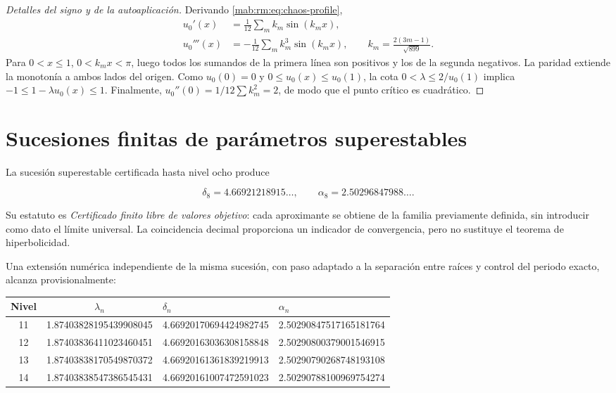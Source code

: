 \begin{proof}[Detalles del signo y de la autoaplicaci\'on]
Derivando \cref{mab:rm:eq:chaos-profile},
\begin{align*}
u_0'(x)&=\frac1{12}\sum_m k_m\sin(k_mx),\\
u_0'''(x)&=-\frac1{12}\sum_m k_m^3\sin(k_mx),
\qquad k_m=\frac{2(3m-1)}{\sqrt{899}}.
\end{align*}
Para \(0<x\le1\), \(0<k_mx<\pi\), luego todos los sumandos de la primera
l\'inea son positivos y los de la segunda negativos. La paridad extiende la
monoton\'ia a ambos lados del origen. Como \(u_0(0)=0\) y
\(0\le u_0(x)\le u_0(1)\), la cota
\(0<\lambda\le2/u_0(1)\) implica
\(-1\le1-\lambda u_0(x)\le1\). Finalmente,
\(u_0''(0)=1/12\sum k_m^2=2\), de modo que el punto cr\'itico es
cuadr\'atico.
\end{proof}

\section{Sucesiones finitas de par\'ametros superestables}

La sucesi\'on superestable certificada hasta nivel ocho produce

\[
\delta_8=4.66921218915\ldots,
\qquad
\alpha_8=2.50296847988\ldots.
\]

Su estatuto es \emph{Certificado finito libre de valores objetivo}: cada
aproximante se obtiene de la familia previamente definida, sin introducir
como dato el l\'imite universal. La coincidencia decimal proporciona un
indicador de convergencia, pero no sustituye el teorema de hiperbolicidad.

Una extensi\'on num\'erica independiente de la misma sucesi\'on, con paso
adaptado a la separaci\'on entre ra\'ices y control del periodo exacto,
alcanza provisionalmente:

\begin{center}
\small
\begin{tabular}{@{}ccll@{}}
\toprule
Nivel & \(\lambda_n\) & \(\delta_n\) & \(\alpha_n\)\\
\midrule
11 & 1.87403828195439908045 & 4.66920170694424982745 & 2.50290847517165181764\\
12 & 1.87403836411023460451 & 4.66920163036308158848 & 2.50290800379001546915\\
13 & 1.87403838170549870372 & 4.66920161361839219913 & 2.50290790268748193108\\
14 & 1.87403838547386545431 & 4.66920161007472591023 & 2.50290788100969754274\\
\bottomrule
\end{tabular}
\end{center}

